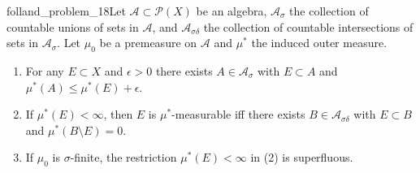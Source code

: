 \begin{mystexercise}{}{folland_problem_18}\label{folland_problem_18}Let $\mathcal{A} \subset \mathcal{P}(X)$ be an algebra, $\mathcal{A}_\sigma$ the collection of countable unions of sets in $\mathcal{A}$, and $\mathcal{A}_{\sigma\delta}$ the collection of countable intersections of sets in $\mathcal{A}_\sigma$. Let $\mu_0$ be a premeasure on $\mathcal{A}$ and $\mu^*$ the induced outer measure.

\begin{enumerate}
\item For any $E \subset X$ and $\epsilon > 0$ there exists $A \in \mathcal{A}_\sigma$ with $E \subset A$ and $\mu^*(A) \le \mu^*(E) + \epsilon$.
\item If $\mu^*(E) < \infty$, then $E$ is $\mu^*$-measurable iff there exists $B \in \mathcal{A}_{\sigma\delta}$ with $E \subset B$ and $\mu^*(B \setminus E) = 0$.
\item If $\mu_0$ is $\sigma$-finite, the restriction $\mu^*(E) < \infty$ in (2) is superfluous.
\end{enumerate}

\end{mystexercise}
